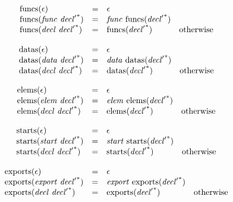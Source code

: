 $$
\begin{array}[t]{@{}lcl@{}l@{}}
{\mathrm{funcs}}(\epsilon) & = & \epsilon \\
{\mathrm{funcs}}({\mathit{func}}~{{\mathit{decl}'}^\ast}) & = & {\mathit{func}}~{\mathrm{funcs}}({{\mathit{decl}'}^\ast}) \\
{\mathrm{funcs}}({\mathit{decl}}~{{\mathit{decl}'}^\ast}) & = & {\mathrm{funcs}}({{\mathit{decl}'}^\ast}) & \quad \mbox{otherwise} \\
\end{array}
$$

$$
\begin{array}[t]{@{}lcl@{}l@{}}
{\mathrm{datas}}(\epsilon) & = & \epsilon \\
{\mathrm{datas}}({\mathit{data}}~{{\mathit{decl}'}^\ast}) & = & {\mathit{data}}~{\mathrm{datas}}({{\mathit{decl}'}^\ast}) \\
{\mathrm{datas}}({\mathit{decl}}~{{\mathit{decl}'}^\ast}) & = & {\mathrm{datas}}({{\mathit{decl}'}^\ast}) & \quad \mbox{otherwise} \\
\end{array}
$$

$$
\begin{array}[t]{@{}lcl@{}l@{}}
{\mathrm{elems}}(\epsilon) & = & \epsilon \\
{\mathrm{elems}}({\mathit{elem}}~{{\mathit{decl}'}^\ast}) & = & {\mathit{elem}}~{\mathrm{elems}}({{\mathit{decl}'}^\ast}) \\
{\mathrm{elems}}({\mathit{decl}}~{{\mathit{decl}'}^\ast}) & = & {\mathrm{elems}}({{\mathit{decl}'}^\ast}) & \quad \mbox{otherwise} \\
\end{array}
$$

$$
\begin{array}[t]{@{}lcl@{}l@{}}
{\mathrm{starts}}(\epsilon) & = & \epsilon \\
{\mathrm{starts}}({\mathit{start}}~{{\mathit{decl}'}^\ast}) & = & {\mathit{start}}~{\mathrm{starts}}({{\mathit{decl}'}^\ast}) \\
{\mathrm{starts}}({\mathit{decl}}~{{\mathit{decl}'}^\ast}) & = & {\mathrm{starts}}({{\mathit{decl}'}^\ast}) & \quad \mbox{otherwise} \\
\end{array}
$$

$$
\begin{array}[t]{@{}lcl@{}l@{}}
{\mathrm{exports}}(\epsilon) & = & \epsilon \\
{\mathrm{exports}}({\mathit{export}}~{{\mathit{decl}'}^\ast}) & = & {\mathit{export}}~{\mathrm{exports}}({{\mathit{decl}'}^\ast}) \\
{\mathrm{exports}}({\mathit{decl}}~{{\mathit{decl}'}^\ast}) & = & {\mathrm{exports}}({{\mathit{decl}'}^\ast}) & \quad \mbox{otherwise} \\
\end{array}
$$

